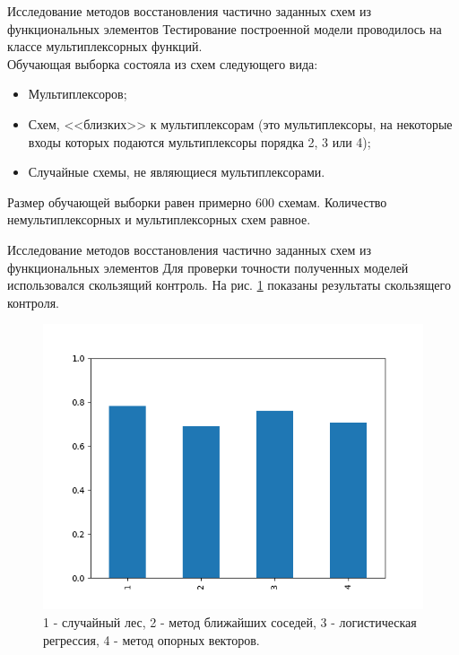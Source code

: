 \documentclass[serif,utf8]{beamer}
\begin{document}
\begin{frame}{Исследование методов восстановления частично заданных схем из функциональных элементов}
Тестирование построенной модели проводилось на классе мультиплексорных функций.\\
Обучающая выборка состояла из схем следующего вида:
\begin{itemize}
\item Мультиплексоров;
\item Схем, <<близких>> к мультиплексорам (это мультиплексоры, на некоторые входы которых подаются мультиплексоры порядка 2, 3 или 4);
\item Случайные схемы, не являющиеся мультиплексорами.
\end{itemize}
Размер обучающей выборки равен примерно 600 схемам. Количество немультиплексорных и мультиплексорных схем равное.\par
\end{frame}


\begin{frame}{Исследование методов восстановления частично заданных схем из функциональных элементов}
Для проверки точности полученных моделей использовался скользящий контроль.
На рис. \ref{picCV} показаны результаты скользящего контроля.\par
\begin{figure}[h!]
   \centering
   \includegraphics[width=0.5\linewidth]{cross_validation.png}
   \caption{\scriptsize{1 - случайный лес, 2 - метод ближайших соседей, 3 - логистическая регрессия, 4 - метод опорных векторов.}}
   \label{picCV}
\end{figure}
\end{frame}
\end{document}

